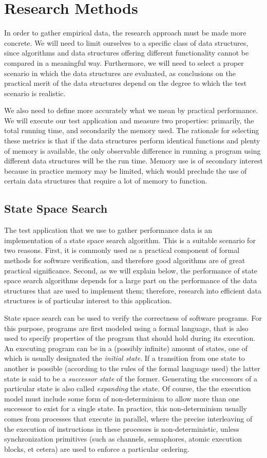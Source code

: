 \documentclass{acm_proc_article-sp}
\begin{document}
\section{Research Methods}
In order to gather empirical data, the research approach must be made more concrete. We will need to limit ourselves to a specific class of data structures, since algorithms and data structures offering different functionality cannot be compared in a meaningful way. Furthermore, we will need to select a proper scenario in which the data structures are evaluated, as conclusions on the practical merit of the data structures depend on the degree to which the test scenario is realistic.

We also need to define more accurately what we mean by practical performance. We will execute our test application and measure two properties: primarily, the total running time, and secondarily the memory used. The rationale for selecting these metrics is that if the data structures perform identical functions and plenty of memory is available, the only observable difference in running a program using different data structures will be the run time. Memory use is of secondary interest because in practice memory may be limited, which would preclude the use of certain data structures that require a lot of memory to function.

\subsection{State Space Search}
The test application that we use to gather performance data is an implementation
of a state space search algorithm.
This is a suitable scenario for two reasons.
First, it is commonly used as a practical
component of formal methods for software verification, and therefore good
algorithms are of great practical significance. Second, as we will explain
below, the performance of state space search algorithms depends for a large
part on the performance of the data structures that are used to implement
them; therefore, research into efficient data structures is of particular
interest to this application.

State space search can be used to verify the correctness of software programs. For this purpose, programs are first modeled using a formal language, that is also used to specify properties of the program that should hold during its
execution. An executing program can be in a (possibly infinite) amount of states,
one of which is usually designated the \emph{initial state}. If a transition
from one state to another is possible (according to the rules of the formal
language used) the latter state is said to be a \emph{successor state} of the
former.
Generating the successors of a particular state is also called
\emph{expanding} the state. Of course, the the execution model
must include some form of non-determinism to allow more than one successor to
exist for a single state.
In practice, this non-determinism usually comes from processes that execute in
parallel, where the precise interleaving of the execution of
instructions in these processes is non-deterministic, unless synchronization
primitives (such as channels, semaphores, atomic execution blocks, et cetera)
are used to enforce a particular ordering.
\end{document}
